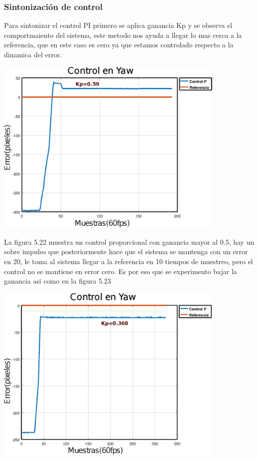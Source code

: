 \subsubsection{Sintonización de control}
Para sintonizar el control PI primero se aplica ganancia Kp y se observa el comportmaiento del sistema, este
metodo nos ayuda a llegar lo mas cerca a la referencia, que en este caso es cero ya que estamos controlado
respecto a la dinamica del error. 
\begin{center}
	\includegraphics[width=0.83\textwidth]{Contenido/Cuerpo/Capitulo5/Fig30.eps}
	\label{Fig4}
\end{center}
La figura 5.22 muestra un control proporcional con ganancia mayor al 0.5, hay un sobre impulso que posteriormente 
hace que el sistema se mantenga con un error en 20, le toma al sistema llegar a la referencia en 10 tiempos de 
muestreo, pero el control no se mantiene en error cero. Es por eso que se experimento bajar la ganancia asi 
como en la figura 5.23
\begin{center}
	\includegraphics[width=0.83\textwidth]{Contenido/Cuerpo/Capitulo5/Fig31.eps}
	\label{Fig4}
\end{center}
